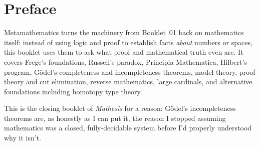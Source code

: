 \chapter*{Preface}

Metamathematics turns the machinery from Booklet~01 back on
mathematics itself: instead of using logic and proof to establish facts
\textit{about} numbers or spaces, this booklet uses them to ask what
proof and mathematical truth even are. It covers Frege's foundations,
Russell's paradox, Principia Mathematica, Hilbert's program, Gödel's
completeness and incompleteness theorems, model theory, proof theory
and cut elimination, reverse mathematics, large cardinals, and
alternative foundations including homotopy type theory.

This is the closing booklet of \textit{Mathesis} for a reason: Gödel's
incompleteness theorems are, as honestly as I can put it, the reason I
stopped assuming mathematics was a closed, fully-decidable system
before I'd properly understood why it isn't.
